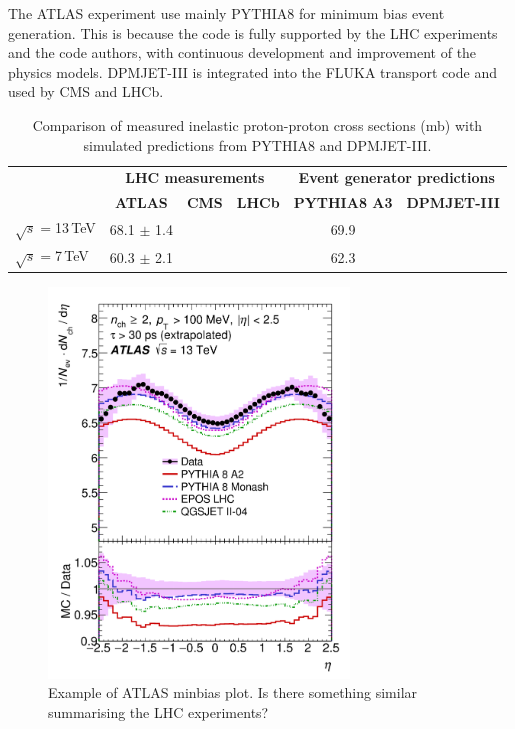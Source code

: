The ATLAS experiment use mainly PYTHIA8 for minimum bias event generation. This is because the code is fully supported by the LHC experiments and the code authors, with continuous development and improvement of the physics models. DPMJET-III is integrated into the FLUKA transport code and used by CMS and LHCb.


\begin{table}[h]
\begin{center}
\caption{Comparison of measured inelastic proton-proton cross sections (mb) with simulated predictions from PYTHIA8 and DPMJET-III.}
\label{tab:ppXS}
\begin{tabular}{lccccc}
\hline\hline
 & \multicolumn{3}{c}{\textbf{LHC measurements}} & \multicolumn{2}{c}{\textbf{Event generator predictions}}\\
  & \textbf{ATLAS}  & \textbf{CMS} & \textbf{LHCb} & \textbf{PYTHIA8 A3} & \textbf{DPMJET-III} \\
\hline
$\sqrt{s} =  $13\,TeV    & 68.1 $\pm$  1.4    &   &  & 69.9  & \\
$\sqrt{s} =  $7\,TeV   & 60.3  $\pm$  2.1   &     &  & 62.3 & \\
\hline\hline
\end{tabular}
\end{center}
\end{table}

\begin{figure}[ht]
\begin{center}
\includegraphics[width=8cm]{figures/RadiationSimulation/minbiasExample.png}
\caption{Example of ATLAS minbias plot. Is there something similar summarising the LHC experiments?}
\label{fig:line}
\end{center}
\end{figure}



